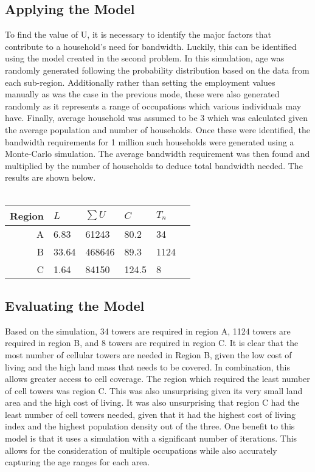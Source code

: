 \documentclass[12pt]{article}
\begin{document}
\subsection{Applying the Model}
To find the value of U, it is necessary to identify the major factors that contribute to a household's need for bandwidth. Luckily, this can be identified using the model created in the second problem. In this simulation, age was randomly generated following the probability distribution based on the data from each sub-region. Additionally rather than setting the employment values manually as was the case in the previous mode, these were also generated randomly as it represents a range of occupations which various individuals may have. Finally, average household was assumed to be 3 which was calculated given the average population and number of households.  Once these were identified, the bandwidth requirements for 1 million such households were generated using a Monte-Carlo simulation. The average bandwidth requirement was then found and multiplied by the number of households to deduce total bandwidth needed. The results are shown below.
\\
\\
\begin{tabular}{|r|p{1in}|p{1in}|p{1in}|p{1in}|p{1in}|}
\hline
\textbf{Region} & \textbf{$L$} & \textbf{$\sum{U}$} & \textbf{$C$} & \textbf{$T_n$} 
\\
\hline
A & 6.83 & 61243 & 80.2 & 34
\\
\hline
B & 33.64 & 468646 & 89.3 & 1124
\\
\hline
C & 1.64 & 84150 & 124.5 & 8
\\
\hline
\end{tabular}


\subsection{Evaluating the Model}
Based on the simulation, 34 towers are required in region A, 1124 towers are required in region B, and 8 towers are required in region C. It is clear that the most number of cellular towers are needed in  Region B,  given the low cost of living and the high land mass that needs to be covered. In combination, this allows greater access to cell coverage. The region which required the least number of cell towers was region C. This was also unsurprising given its very small land area and the high cost of living. It was also unsurprising that region C had the least number of cell towers needed, given that it had the highest cost of living index and the highest population density out of the three. One benefit to this model is that it uses a simulation with a significant number of iterations. This allows for the consideration of multiple occupations while also accurately capturing the age ranges for each area.
\end{document}
